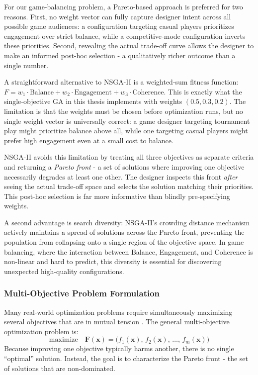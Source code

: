 \begin{sloppypar}
For our game-balancing problem, a Pareto-based approach is preferred for two reasons. First, no weight vector can fully capture designer intent across all possible game audiences: a configuration targeting casual players prioritizes engagement over strict balance, while a competitive-mode configuration inverts these priorities. Second, revealing the actual trade-off curve allows the designer to make an informed post-hoc selection - a qualitatively richer outcome than a single number.
\end{sloppypar}

A straightforward alternative to NSGA-II is a weighted-sum fitness function: $F = w_1 \cdot \text{Balance} + w_2 \cdot \text{Engagement} + w_3 \cdot \text{Coherence}$. This is exactly what the single-objective GA in this thesis implements with weights $(0.5, 0.3, 0.2)$. The limitation is that the weights must be chosen before optimization runs, but no single weight vector is universally correct: a game designer targeting tournament play might prioritize balance above all, while one targeting casual players might prefer high engagement even at a small cost to balance.

NSGA-II avoids this limitation by treating all three objectives as separate criteria and returning a \textit{Pareto front} - a set of solutions where improving one objective necessarily degrades at least one other. The designer inspects this front \textit{after} seeing the actual trade-off space and selects the solution matching their priorities. This post-hoc selection is far more informative than blindly pre-specifying weights.

A second advantage is search diversity: NSGA-II's crowding distance mechanism actively maintains a spread of solutions across the Pareto front, preventing the population from collapsing onto a single region of the objective space. In game balancing, where the interaction between Balance, Engagement, and Coherence is non-linear and hard to predict, this diversity is essential for discovering unexpected high-quality configurations.

\subsubsection{Multi-Objective Problem Formulation}

Many real-world optimization problems require simultaneously maximizing several objectives that are in mutual tension \cite{deb2002fast,coello2007evolutionary}. The general multi-objective optimization problem is:
\begin{equation}
\text{maximize} \quad \mathbf{F}(\mathbf{x}) = \bigl(f_1(\mathbf{x}),\, f_2(\mathbf{x}),\, \ldots,\, f_m(\mathbf{x})\bigr)
\end{equation}
Because improving one objective typically harms another, there is no single ``optimal'' solution. Instead, the goal is to characterize the Pareto front - the set of solutions that are non-dominated.


